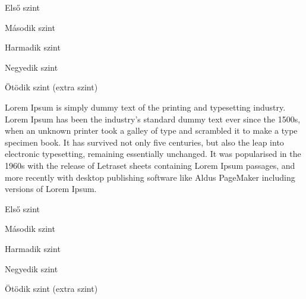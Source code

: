 \documentclass[12]{article}
\begin{document}
\begin{myenum}[resume]
    \item Első szint
    \begin{myenum}
        \item Második szint
        \begin{myenum}
            \item Harmadik szint
            \begin{myenum}
                \item Negyedik szint
                \begin{myenum}
                    \item Ötödik szint (extra szint)
                \end{myenum}
            \end{myenum}
        \end{myenum}
    \end{myenum}
\end{myenum}


Lorem Ipsum is simply dummy text of the printing and typesetting industry. Lorem Ipsum has been the industry's standard dummy text ever since the 1500s, when an unknown printer took a galley of type and scrambled it to make a type specimen book. It has survived not only five centuries, but also the leap into electronic typesetting, remaining essentially unchanged. It was popularised in the 1960s with the release of Letraset sheets containing Lorem Ipsum passages, and more recently with desktop publishing software like Aldus PageMaker including versions of Lorem Ipsum.

\begin{myenum}[resume]
    \item Első szint
    \begin{myenum}
        \item Második szint
        \begin{myenum}
            \item Harmadik szint
            \begin{myenum}
                \item Negyedik szint
                \begin{myenum}
                    \item Ötödik szint (extra szint)
                \end{myenum}
            \end{myenum}
        \end{myenum}
    \end{myenum}
\end{myenum}
\newpage
\end{document}
